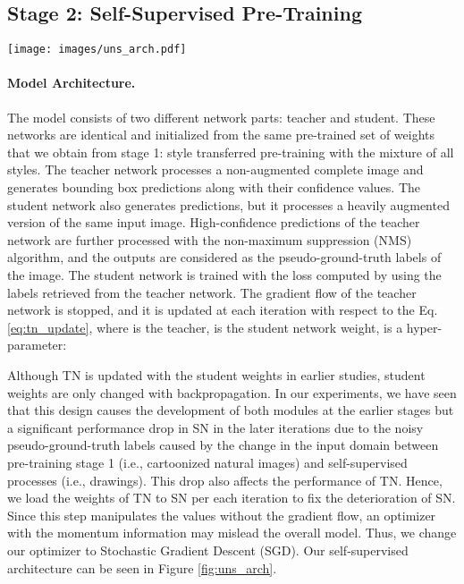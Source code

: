 \documentclass{article}
\begin{document}
\subsection{Stage 2: Self-Supervised Pre-Training}
\label{subsection:teac_stu}

\begin{figure*}
    \centering
    \texttt{[image: images/uns\_arch.pdf]}
    \caption{Our stage 2 teacher-student network training process.}
    \label{fig:uns_arch}
\end{figure*}

\paragraph{Model Architecture.}{The model consists of two different network parts: teacher and student. These networks are identical and initialized from the same pre-trained set of weights that we obtain from stage 1: style transferred pre-training with the mixture of all styles. The teacher network processes a non-augmented complete image and generates bounding box predictions along with their confidence values. The student network also generates predictions, but it processes a heavily augmented version of the same input image. High-confidence predictions of the teacher network are further processed with the non-maximum suppression (NMS) algorithm, and the outputs are considered as the pseudo-ground-truth labels of the image. The student network is trained with the loss computed by using the labels retrieved from the teacher network. The gradient flow of the teacher network is stopped, and it is updated at each iteration with respect to the Eq. \ref{eq:tn_update}, where  is the teacher,  is the student network weight,  is a hyper-parameter:



\noindent Although TN is updated with the student weights in earlier studies, student weights are only changed with backpropagation. In our experiments, we have seen that this design causes the development of both modules at the earlier stages but a significant performance drop in SN in the later iterations due to the noisy pseudo-ground-truth labels caused by the change in the input domain between pre-training stage 1 (i.e., cartoonized natural images) and self-supervised processes (i.e., drawings). This drop also affects the performance of TN. Hence, we load the weights of TN to SN per each  iteration to fix the deterioration of SN. Since this step manipulates the values without the gradient flow, an optimizer with the momentum information may mislead the overall model. Thus, we change our optimizer to Stochastic Gradient Descent (SGD). Our self-supervised architecture can be seen in Figure \ref{fig:uns_arch}.}
\end{document}
